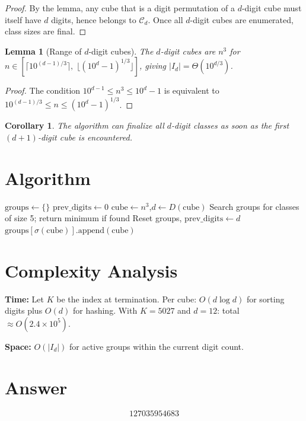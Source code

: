 \documentclass[12pt,a4paper]{article}
\newtheorem{lemma}[theorem]{Lemma}
\newtheorem{corollary}[theorem]{Corollary}
\begin{document}
\begin{proof}
By the lemma, any cube that is a digit permutation of a $d$-digit cube must itself have $d$ digits, hence belongs to $\mathcal{C}_d$. Once all $d$-digit cubes are enumerated, class sizes are final.
\end{proof}

\begin{lemma}[Range of $d$-digit cubes]
The $d$-digit cubes are $n^3$ for $n \in [\lceil 10^{(d-1)/3} \rceil,\; \lfloor (10^d - 1)^{1/3} \rfloor]$, giving $|I_d| = \Theta(10^{d/3})$.
\end{lemma}

\begin{proof}
The condition $10^{d-1} \le n^3 \le 10^d - 1$ is equivalent to $10^{(d-1)/3} \le n \le (10^d - 1)^{1/3}$.
\end{proof}

\begin{corollary}
The algorithm can finalize all $d$-digit classes as soon as the first $(d+1)$-digit cube is encountered.
\end{corollary}

\section{Algorithm}

\begin{algorithm}[H]
\caption{Find smallest cube with exactly 5 cubic digit permutations}
\begin{algorithmic}[1]
\STATE $\mathrm{groups} \gets \{\}$ 
\STATE $\mathrm{prev\_digits} \gets 0$
    \STATE $\mathrm{cube} \gets n^3$,\quad $d \gets D(\mathrm{cube})$
        \STATE Search groups for classes of size 5; return minimum if found
        \STATE Reset groups, $\mathrm{prev\_digits} \gets d$
    \ENDIF
    \STATE $\mathrm{groups}[\sigma(\mathrm{cube})].\mathrm{append}(\mathrm{cube})$
\ENDFOR
\end{algorithmic}
\end{algorithm}

\section{Complexity Analysis}

\textbf{Time:} Let $K$ be the index at termination. Per cube: $O(d \log d)$ for sorting digits plus $O(d)$ for hashing. With $K = 5027$ and $d = 12$: total $\approx O(2.4 \times 10^5)$.

\textbf{Space:} $O(|I_d|)$ for active groups within the current digit count.

\section{Answer}

\[
\boxed{127035954683}
\]
\end{document}
